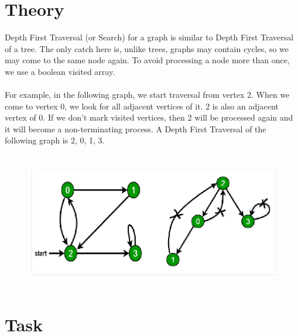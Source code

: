\documentclass[11pt]{article}            %
\begin{document}
\section{Theory }              
\justify Depth First Traversal (or Search) for a graph is similar to Depth First Traversal of a tree. The only catch here is, unlike trees, graphs may contain cycles, so we may come to the same node again. To avoid processing a node more than once, we use a boolean visited array.\\~\\
For example, in the following graph, we start traversal from vertex 2. When we come to vertex 0, we look for all adjacent vertices of it. 2 is also an adjacent vertex of 0. If we don’t mark visited vertices, then 2 will be processed again and it will become a non-terminating process. A Depth First Traversal of the following graph is 2, 0, 1, 3.
\begin{figure}[H]
\centering
  \includegraphics[width=12cm,height=6cm,keepaspectratio]{5.png}    
\end{figure}
\section{Task}  
\end{document}
